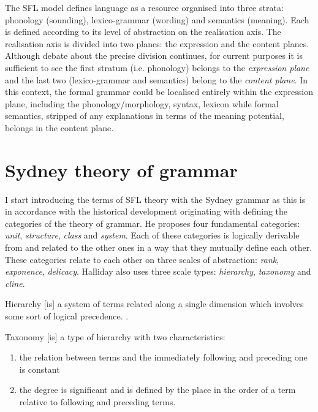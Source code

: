 The SFL model defines language as a resource organised into three strata: phonology (sounding), lexico-grammar (wording) and semantics (meaning). Each is defined according to its level of abstraction on the realisation axis. The realisation axis is divided into two planes: the expression and the content planes. 
Although debate about the precise division continues, for current purposes it is sufficient to see the first stratum (i.e. phonology) belongs to the \textit{expression plane} and the last two (lexico-grammar and semantics) belong to the \textit{content plane}.
In this context, the formal grammar could be localised entirely within the expression plane, including the phonology/morphology, syntax, lexicon while formal semantics, stripped of any explanations in terms of the meaning potential, belongs in the content plane.

\section{Sydney theory of grammar}
\label{sec:sydney-theory-of-grammar}
I start introducing the terms of SFL theory with the Sydney grammar as this is in accordance with the historical development originating with \citet{Halliday2002} defining the categories of the theory of grammar. He proposes four fundamental categories: \textit{unit}, \textit{structure}, \textit{class} and \textit{system}. Each of these categories is logically derivable from and related to the other ones in a way that they mutually define each other. These categories relate to each other on three scales of abstraction: \textit{rank}, \textit{exponence}, \textit{delicacy}. Halliday also uses three scale types: \textit{hierarchy}, \textit{taxonomy} and \textit{cline}.

\begin{definition}[Hierarchy]\label{def:hierarchy}
	Hierarchy [is] a system of terms related along a single dimension which involves some sort of logical precedence. 
	\citep[42]{Halliday2002}. 
\end{definition}

\begin{definition}[Taxonomy]\label{def:taxonomy}
	Taxonomy [is] a type of hierarchy with two characteristics:
	\begin{enumerate}
		\item the relation between terms and the immediately following and preceding one is constant
		\item the degree is significant and is defined by the place in the order of a term relative to following and preceding terms. \citep[42]{Halliday2002}
	\end{enumerate}
\end{definition} 

